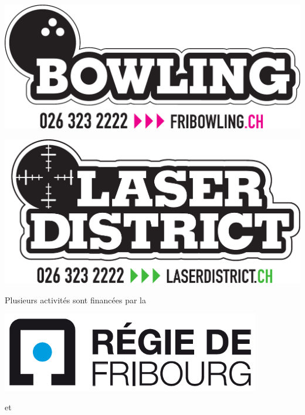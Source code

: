 \cleardoublepage

\thispagestyle{empty}%
{\centering
\vspace*{15mm}
\includegraphics[width=.90\textwidth]{bowling0.pdf}
\vspace*{25mm}

\includegraphics[width=.90\textwidth]{bowling1.pdf}
\par
}

\clearpage

\begin{center}
{\Huge Plusieurs activités sont financées par la}
\vspace*{5mm}
\par
\includegraphics[width=0.85\textwidth]{regie_fribourg.pdf}
\end{center}

\vfill
\begin{center}
	{\Huge et}
\end{center}
\vfill

